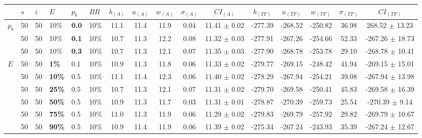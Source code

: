 \begin{sidewaystable}
    \hspace*{-0.7cm}
    \begin{tabular}{|l|l|l|l|l|l||c|c|c|c|c|c|c|c|c|c|}
    \hline
    ~ & $s$ & $i$ & $E$ & $p_{b}$ & $BR$ & $b_{(A)}$ & $a_{(A)}$ & $w_{(A)}$ & $\sigma_{(A)}$ & $CI_{(A)}$ & $b_{(TF)}$ & $a_{(TF)}$ & $w_{(TF)}$ & $\sigma_{(TF)}$ & $CI_{(TF)}$\\
    \hline
    $p_{b}$ & 50 & 50 & 10\% & \textbf{0.0} & 10\% & 11.1 & 11.4 & 11.9 & 0.04 & 11.41 $\pm$ 0.02 & -277.39 & -268.52 & -250.82 & 36.98 & 268.52 $\pm$ 13.23 \\
    ~ & 50 & 50 & 10\% & \textbf{0.1} & 10\% & 10.7 & 11.3 & 12.2 & 0.08 & 11.32 $\pm$ 0.03 & -277.91 & -267.26 & -254.66 & 52.33 & -267.26 $\pm$ 18.73 \\
    ~ & 50 & 50 & 10\% & \textbf{0.3} & 10\% & 10.7 & 11.3 & 12.1 & 0.07 & 11.35 $\pm$ 0.03 & -277.90 & -268.78 & -253.78 & 29.10 & -268.78 $\pm$ 10.41 \\
    \hline
    \hline
    $E$ & 50 & 50 & \textbf{1\%} & 0.1 & 10\% & 10.9 & 11.3 & 11.8 & 0.06 & 11.33 $\pm$ 0.02 & -279.77 & -269.15 & -248.42 & 41.94 & -269.15 $\pm$ 15.01 \\
    ~ & 50 & 50 & \textbf{10\%} & 0.5 & 10\% & 11.1 & 11.4 & 12.3 & 0.06 & 11.40 $\pm$ 0.02 & -278.29 & -267.94 & -254.21 & 39.08 & -267.94 $\pm$ 13.98 \\
    ~ & 50 & 50 & \textbf{25\%} & 0.5 & 10\% & 10.7 & 11.3 & 12.1 & 0.07 & 11.31 $\pm$ 0.02 & -279.70 & -269.58 & -250.41 & 45.83 & -269.58 $\pm$ 16.39 \\
    ~ & 50 & 50 & \textbf{50\%} & 0.5 & 10\% & 10.9 & 11.3 & 11.7 & 0.03 & 11.31 $\pm$ 0.01 & -278.87 & -270.39 & -259.73 & 25.54 & -270.39 $\pm$ 9.14 \\
    ~ & 50 & 50 & \textbf{75\%} & 0.5 & 10\% & 11.0 & 11.3 & 11.9 & 0.06 & 11.29 $\pm$ 0.02 & -279.83 & -269.79 & -257.92 & 29.82 & -269.79 $\pm$ 10.67 \\
    ~ & 50 & 50 & \textbf{90\%} & 0.5 & 10\% & 10.9 & 11.4 & 11.9 & 0.06 & 11.39 $\pm$ 0.02 & -275.34 & -267.24 & -243.93 & 35.39 & -267.24 $\pm$ 12.67 \\

\end{tabular}
\end{sidewaystable}
